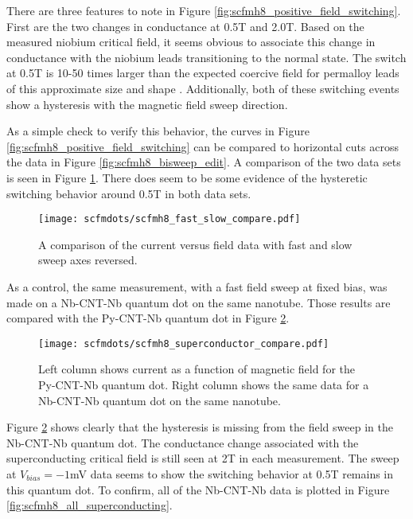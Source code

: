 There are three features to note in Figure \ref{fig:scfmh8_positive_field_switching}. First are the two changes in conductance at 0.5T and 2.0T. Based on the measured niobium critical field, it seems obvious to associate this change in conductance with the niobium leads transitioning to the normal state. The switch at 0.5T is 10-50 times larger than the expected coercive field for permalloy leads of this approximate size and shape \cite{Aurich2010, Preusche2009}. Additionally, both of these switching events show a hysteresis with the magnetic field sweep direction. 

As a simple check to verify this behavior, the curves in Figure \ref{fig:scfmh8_positive_field_switching} can be compared to horizontal cuts across the data in Figure \ref{fig:scfmh8_bisweep_edit}. A comparison of the two data sets is seen in Figure \ref{fig:scfmh8_fast_slow_compare}. There does seem to be some evidence of the hysteretic switching behavior around 0.5T in both data sets.

\begin{figure}
    \centering
    \texttt{[image: scfmdots/scfmh8\_fast\_slow\_compare.pdf]}
    \caption{A comparison of the current versus field data with fast and slow sweep axes reversed.}
    \label{fig:scfmh8_fast_slow_compare}
\end{figure}

As a control, the same measurement, with a fast field sweep at fixed bias, was made on a Nb-CNT-Nb quantum dot on the same nanotube. Those results are compared with the Py-CNT-Nb quantum dot in Figure \ref{fig:scfmh8_superconductor_compare}.

\begin{figure}
    \centering
    \texttt{[image: scfmdots/scfmh8\_superconductor\_compare.pdf]}
    \caption{Left column shows current as a function of magnetic field for the Py-CNT-Nb quantum dot. Right column shows the same data for a Nb-CNT-Nb quantum dot on the same nanotube.}
    \label{fig:scfmh8_superconductor_compare}
\end{figure}

Figure \ref{fig:scfmh8_superconductor_compare} shows clearly that the hysteresis is missing from the field sweep in the Nb-CNT-Nb quantum dot. The conductance change associated with the superconducting critical field is still seen at 2T in each measurement. The sweep at $V_{bias}=-1$mV data seems to show the switching behavior at 0.5T remains in this quantum dot. To confirm, all of the Nb-CNT-Nb data is plotted in Figure \ref{fig:scfmh8_all_superconducting}.

